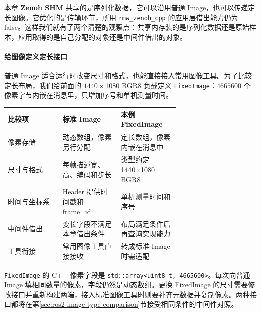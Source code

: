 本章 \textbf{Zenoh SHM} 共享的是序列化数据，它可以沿用普通 Image，也可以传递定长图像。它优化的是传输环节，所用 \texttt{rmw\_zenoh\_cpp} 的应用层借出能力仍为 false。这样我们就有了两个清楚的观察点：共享内存装的是序列化数据还是原始样本，应用取得的是自己分配的对象还是中间件借出的对象。

\paragraph*{给图像定义定长接口}
普通 Image 适合运行时改变尺寸和格式，也能直接接入常用图像工具。为了比较定长布局，我们给前面的 $1440\times1080$ BGR8 负载定义 \texttt{FixedImage}：$4665600$ 个像素字节内嵌在消息里，只增加序号和单机测量时间。
\par\medskip\noindent\begin{minipage}{\linewidth}

\end{minipage}\par\smallskip

\begin{center}
\small
\begin{tabular}{lp{0.34\linewidth}p{0.34\linewidth}}
\toprule
比较项 & 标准 Image & 本例 FixedImage\\
\midrule
像素存储 & 动态数组，像素另行分配 & 定长数组，像素内嵌在消息中\\
尺寸与格式 & 每帧描述宽、高、编码和步长 & 类型约定 1440×1080 BGR8\\
时间与坐标系 & Header 提供时间戳和 frame\_id & 单机测量时间和序号\\
中间件借出 & 变长字段不满足本章借出条件 & 布局满足条件后再查询实现能力\\
工具衔接 & 常用图像工具直接接收 & 转成标准 Image 时需适配\\
\bottomrule
\end{tabular}
\end{center}
\texttt{FixedImage} 的 C++ 像素字段是 \nolinkurl{std::array<uint8_t, 4665600>}。每次向普通 Image 填相同数量的像素，字段仍然是动态数组。更换 FixedImage 的尺寸需要修改接口并重新构建两端，接入标准图像工具时则要补齐元数据并复制像素。两种接口都将在第\ref{sec:ros2-image-type-comparison}节接受相同条件的中间件对照。

